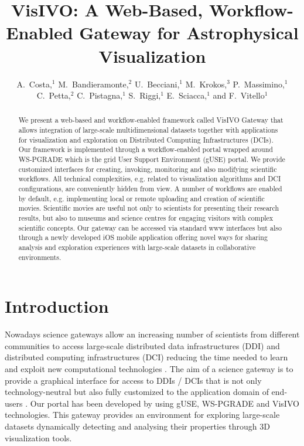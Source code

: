 
\resetcounters




\title{VisIVO: A Web-Based, Workflow-Enabled Gateway for Astrophysical Visualization}
\author{A.~Costa,$^1$ M.~Bandieramonte,$^2$ U.~Becciani,$^1$ M.~Krokos,$^3$ P.~Massimino,$^1$ C.~Petta,$^2$ C.~Pistagna,$^1$ S.~Riggi,$^1$ E.~Sciacca,$^1$ and F.~Vitello$^1$}


\begin{abstract}
We present a web-based and workflow-enabled framework called VisIVO Gateway that allows integration of large-scale multidimensional datasets together with applications for visualization and exploration on Distributed Computing Infrastructures (DCIs).
Our framework is implemented through a workflow-enabled portal wrapped around WS-PGRADE which is the grid User Support Environment (gUSE) portal.  We provide customized interfaces for creating, invoking, monitoring and also modifying scientific workflows. All technical complexities, e.g. related to visualization algorithms and DCI configurations, are conveniently hidden from view.
A number of workflows are enabled by default, e.g. implementing local or remote uploading and creation of scientific movies. Scientific movies are useful not only to scientists for presenting their research results, but also to museums and science centres for engaging visitors with complex scientific concepts.
Our gateway can be accessed via standard www interfaces but also through a newly developed iOS mobile application offering novel ways for sharing analysis and exploration experiences with large-scale datasets in collaborative environments.
\end{abstract}

\section{Introduction}
Nowadays science gateways allow an increasing number of scientists from different communities to access large-scale distributed data infrastructures (DDI) and distributed computing infrastructures (DCI) reducing the time needed to learn and exploit new computational technologies \citep{borkin2011visualization}. The aim of a science gateway is to provide a graphical interface for access to DDIs / DCIs that is not only technology-neutral but also fully customized to the application domain of end-users \citep{abt_1990}. Our portal has been developed by using gUSE, WS-PGRADE  \citep{kacsuk2011p}  and VisIVO \citep{becciani2010visivo} technologies. This gateway provides an environment for exploring large-scale datasets dynamically detecting and analysing their properties through 3D visualization tools. 

